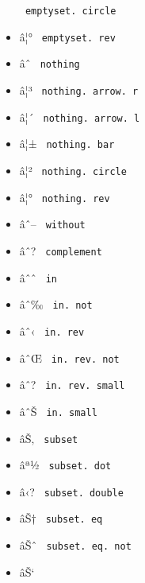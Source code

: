 \begin{itemize}
{  \texttt{\ emptyset.\ circle\ }}
\item
  \label{symbol-emptyset.rev}{{ â¦° }
  \texttt{\ emptyset.\ rev\ }}
\item
  \label{symbol-nothing}{{ âˆ } \texttt{\ nothing\ }}
\item
  \label{symbol-nothing.arrow.r}{{ â¦³ }
  \texttt{\ nothing.\ arrow.\ r\ }}
\item
  \label{symbol-nothing.arrow.l}{{ â¦´ }
  \texttt{\ nothing.\ arrow.\ l\ }}
\item
  \label{symbol-nothing.bar}{{ â¦± }
  \texttt{\ nothing.\ bar\ }}
\item
  \label{symbol-nothing.circle}{{ â¦² }
  \texttt{\ nothing.\ circle\ }}
\item
  \label{symbol-nothing.rev}{{ â¦° }
  \texttt{\ nothing.\ rev\ }}
\item
  \label{symbol-without}{{ âˆ-- } \texttt{\ without\ }}
\item
  \label{symbol-complement}{{ âˆ? }
  \texttt{\ complement\ }}
\item
  \label{symbol-in}{{ âˆˆ } \texttt{\ in\ }}
\item
  \label{symbol-in.not}{{ âˆ‰ } \texttt{\ in.\ not\ }}
\item
  \label{symbol-in.rev}{{ âˆ‹ } \texttt{\ in.\ rev\ }}
\item
  \label{symbol-in.rev.not}{{ âˆŒ }
  \texttt{\ in.\ rev.\ not\ }}
\item
  \label{symbol-in.rev.small}{{ âˆ? }
  \texttt{\ in.\ rev.\ small\ }}
\item
  \label{symbol-in.small}{{ âˆŠ }
  \texttt{\ in.\ small\ }}
\item
  \label{symbol-subset}{{ âŠ‚ } \texttt{\ subset\ }}
\item
  \label{symbol-subset.dot}{{ âª½ }
  \texttt{\ subset.\ dot\ }}
\item
  \label{symbol-subset.double}{{ â‹? }
  \texttt{\ subset.\ double\ }}
\item
  \label{symbol-subset.eq}{{ âŠ† }
  \texttt{\ subset.\ eq\ }}
\item
  \label{symbol-subset.eq.not}{{ âŠˆ }
  \texttt{\ subset.\ eq.\ not\ }}
\item
  \label{symbol-subset.eq.sq}{{ âŠ` }
}
\end{itemize}

